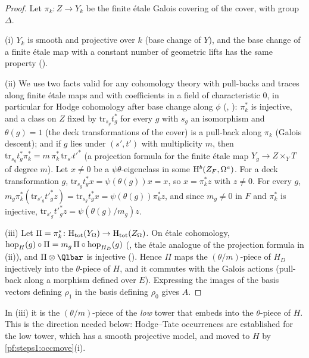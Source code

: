 \begin{proof}
Let $\pi_k\colon Z\to Y_k$ be the finite \'etale Galois covering of the cover, with group $\Delta$.

(i) $Y_k$ is smooth and projective over $k$ (base change of $Y$), and the base change of a finite \'etale map with a
constant number of geometric lifts has the same property ().

(ii) We use two facts valid for any cohomology theory with pull-backs and traces along finite \'etale maps and with
coefficients in a field of characteristic $0$, in particular for Hodge cohomology after base change along $\phi$
(, ): $\pi_k^*$ is injective,
and a class on $Z$ fixed by $\mathrm{tr}_{s_g}t_g^*$ for every $g$ with $s_g$ an isomorphism and $\theta(g)=1$ (the deck
transformations of the cover) is a pull-back along $\pi_k$ (Galois descent); and if $g$ lies under $(s',t')$ with
multiplicity $m$, then $\mathrm{tr}_{s_g}t_g^*\pi_k^*=m\,\pi_k^*\,\mathrm{tr}_{s'}t'^*$ (a projection formula for the finite
\'etale map $Y_g\to Z\times_YT$ of degree $m$). Let $x\ne0$ be a $\psi\theta$-eigenclass in some $\mathrm{H}^b(Z_F,\Omega^a)$.
For a deck transformation $g$, $\mathrm{tr}_{s_g}t_g^*x=\psi(\theta(g))x=x$, so $x=\pi_k^*z$ with $z\ne0$. For every $g$,
$m_g\pi_k^*(\mathrm{tr}_{s'_g}t'^*_gz)=\mathrm{tr}_{s_g}t_g^*x=\psi(\theta(g))\pi_k^*z$, and since $m_g\ne0$ in $F$ and $\pi_k^*$ is
injective, $\mathrm{tr}_{s'_g}t'^*_gz=\psi(\theta(g)/m_g)z$.

(iii) Let $\Pi=\pi_k^*\colon\mathrm{H}_{\mathrm{tot}}(Y_{\Omega})\to\mathrm{H}_{\mathrm{tot}}(Z_{\Omega})$. On \'etale cohomology, $\mathrm{hop}_H(g)\circ\Pi
=m_g\,\Pi\circ\mathrm{hop}_{H_D}(g)$ (, the \'etale analogue of the projection
formula in (ii)), and $\Pi\otimes\Qlbar$ is injective (). Hence $\Pi$ maps the
$(\theta/m)$-piece of $H_D$ injectively into the $\theta$-piece of $H$, and it commutes with the Galois actions (pull-back
along a morphism defined over $E$). Expressing the images of the basis vectors defining $\rho_1$ in the basis defining
$\rho_0$ gives $A$.
\end{proof}

\begin{remark}
In (iii) it is the $(\theta/m)$-piece of the \emph{low} tower that embeds into the $\theta$-piece of $H$. This is the direction
needed below: Hodge--Tate occurrences are established for the low tower, which has a smooth projective model, and moved to
$H$ by \cref{pf:steps1:occmove}(i).
\end{remark}

